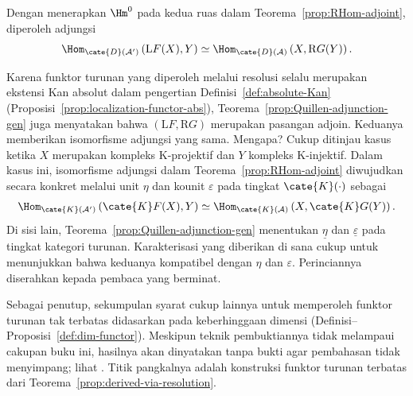 \begin{catatan}
	Dengan menerapkan $\Hm^0$ pada kedua ruas dalam
	Teorema~\ref{prop:RHom-adjoint}, diperoleh adjungsi
	\[ \Hom_{\cate{D}(\mathcal{A'})}\left(\mathrm{L}F(X), Y\right) \simeq \Hom_{\cate{D}(\mathcal{A})}\left(X, \mathrm{R}G(Y) \right). \]

	Karena funktor turunan yang diperoleh melalui resolusi selalu merupakan
	ekstensi Kan absolut dalam pengertian Definisi~\ref{def:absolute-Kan}
	(Proposisi~\ref{prop:localization-functor-abs}),
	Teorema~\ref{prop:Quillen-adjunction-gen} juga menyatakan bahwa
	$(\mathrm{L}F,\mathrm{R}G)$ merupakan pasangan adjoin. Keduanya memberikan
	isomorfisme adjungsi yang sama. Mengapa? Cukup ditinjau kasus ketika
	$X$ merupakan kompleks K-projektif dan $Y$ kompleks K-injektif. Dalam kasus
	ini, isomorfisme adjungsi dalam Teorema~\ref{prop:RHom-adjoint} diwujudkan
	secara konkret melalui unit $\eta$ dan kounit $\varepsilon$ pada tingkat
	$\cate{K}(\cdot)$ sebagai
	\begin{align*}
		\Hom_{\cate{K}(\mathcal{A}')}\left( \cate{K}F(X), Y\right) \simeq \Hom_{\cate{K}(\mathcal{A})}\left( X, \cate{K}G(Y) \right).
	\end{align*}
	Di sisi lain, Teorema~\ref{prop:Quillen-adjunction-gen} menentukan
	$\underline{\eta}$ dan $\underline{\varepsilon}$ pada tingkat kategori
	turunan. Karakterisasi yang diberikan di sana cukup untuk menunjukkan bahwa
	keduanya kompatibel dengan $\eta$ dan $\varepsilon$. Perinciannya diserahkan
	kepada pembaca yang berminat.
\end{catatan}

Sebagai penutup, sekumpulan syarat cukup lainnya untuk memperoleh funktor turunan
tak terbatas didasarkan pada keberhinggaan dimensi
(Definisi--Proposisi~\ref{def:dim-functor}). Meskipun teknik pembuktiannya tidak
melampaui cakupan buku ini, hasilnya akan dinyatakan tanpa bukti agar pembahasan
tidak menyimpang; lihat {\cite[Tags 07K6, 07K7]{stacks}}. Titik pangkalnya
adalah konstruksi funktor turunan terbatas dari
Teorema~\ref{prop:derived-via-resolution}.

